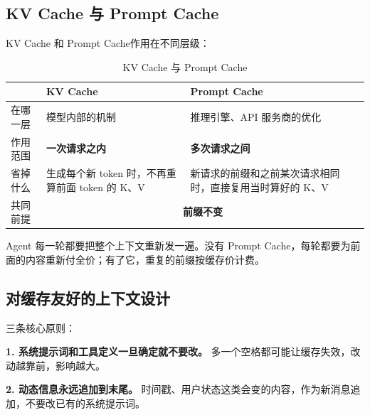 \subsection{KV Cache 与 Prompt Cache}
KV Cache 和 Prompt Cache作用在不同层级：
\begin{table}[H]
\centering
\caption{KV Cache 与 Prompt Cache}
\label{tab:kv-vs-prompt-cache}
\begin{tabular}{p{2.6cm} p{6.0cm} p{6.0cm}}
  \toprule
   & \textbf{KV Cache} & \textbf{Prompt Cache} \\
  \midrule
  在哪一层 & 模型内部的机制 & 推理引擎、API 服务商的优化 \\
  \addlinespace
  作用范围 & \textbf{一次请求之内} & \textbf{多次请求之间} \\
  \addlinespace
  省掉什么 &
    生成每个新 token 时，不再重算前面 token 的 K、V &
    新请求的前缀和之前某次请求相同时，直接复用当时算好的 K、V \\
  \addlinespace
  共同前提 & \multicolumn{2}{c}{\textbf{前缀不变}} \\
  \bottomrule
\end{tabular}
\end{table}
Agent 每一轮都要把整个上下文重新发一遍。没有 Prompt Cache，每轮都要为前面的内容重新付全价；有了它，重复的前缀按缓存价计费。
\subsection{对缓存友好的上下文设计}
三条核心原则：

\textbf{1. 系统提示词和工具定义一旦确定就不要改。} 多一个空格都可能让缓存失效，改动越靠前，影响越大。

\textbf{2. 动态信息永远追加到末尾。} 时间戳、用户状态这类会变的内容，作为新消息追加，不要改已有的系统提示词。


